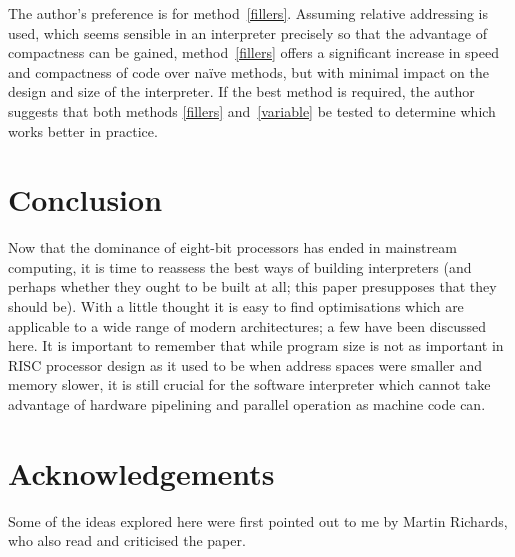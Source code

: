 \documentclass{article}
\begin{document}
The author's preference is for method~\ref{fillers}. Assuming relative addressing
is used, which seems sensible in an interpreter precisely so that the advantage
of compactness can be gained, method~\ref{fillers} offers a significant increase
in speed and compactness of code over na\"ive methods, but with minimal impact on
the design and size of the interpreter. If the best method is required, the author
suggests that both methods \ref{fillers} and~\ref{variable} be tested to determine
which works better in practice.


\section{Conclusion}

Now that the dominance of eight-bit processors has ended in mainstream computing,
it is time to reassess the best ways of building interpreters (and perhaps whether
they ought to be built at all; this paper presupposes that they should be). With
a little thought it is easy to find optimisations which are applicable to a wide
range of modern architectures; a few have been discussed here. It is important
to remember that while program size is not as important in RISC processor design
as it used to be when address spaces were smaller and memory slower, it is still
crucial for the software interpreter which cannot take advantage of hardware pipelining
and parallel operation as machine code can.


\section{Acknowledgements}

Some of the ideas explored here were first pointed out to me by Martin Richards,
who also read and criticised the paper.
\end{document}
